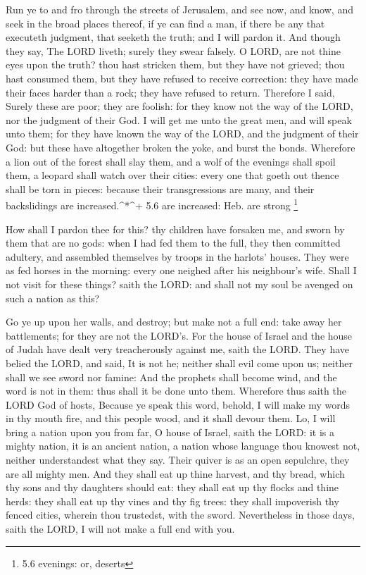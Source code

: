  Run ye to and fro through the streets of Jerusalem, and see
now, and know, and seek in the broad places thereof, if ye can find a
man, if there be any that executeth judgment, that seeketh the truth;
and I will pardon it.  And though they say, The LORD liveth;
surely they swear falsely.  O LORD, are not thine eyes upon
the truth? thou hast stricken them, but they have not grieved; thou hast
consumed them, but they have refused to receive correction: they have
made their faces harder than a rock; they have refused to return.
 Therefore I said, Surely these are poor; they are foolish:
for they know not the way of the LORD, nor the judgment of their God.
 I will get me unto the great men, and will speak unto them;
for they have known the way of the LORD, and the judgment of their God:
but these have altogether broken the yoke, and burst the bonds.
 Wherefore a lion out of the forest shall slay them, and a
wolf of the evenings shall spoil them, a leopard shall watch over their
cities: every one that goeth out thence shall be torn in pieces: because
their transgressions are many, and their backslidings are
increased.\^{}*\^{}+ 5.6 are increased: Heb. are strong \footnote{5.6
  evenings: or, deserts}

 How shall I pardon thee for this? thy children have
forsaken me, and sworn by them that are no gods: when I had fed them to
the full, they then committed adultery, and assembled themselves by
troops in the harlots' houses.  They were as fed horses in
the morning: every one neighed after his neighbour's wife. 
Shall I not visit for these things? saith the LORD: and shall not my
soul be avenged on such a nation as this?

 Go ye up upon her walls, and destroy; but make not a full
end: take away her battlements; for they are not the LORD's.
 For the house of Israel and the house of Judah have dealt
very treacherously against me, saith the LORD.  They have
belied the LORD, and said, It is not he; neither shall evil come upon
us; neither shall we see sword nor famine:  And the
prophets shall become wind, and the word is not in them: thus shall it
be done unto them.  Wherefore thus saith the LORD God of
hosts, Because ye speak this word, behold, I will make my words in thy
mouth fire, and this people wood, and it shall devour them.
 Lo, I will bring a nation upon you from far, O house of
Israel, saith the LORD: it is a mighty nation, it is an ancient nation,
a nation whose language thou knowest not, neither understandest what
they say.  Their quiver is as an open sepulchre, they are
all mighty men.  And they shall eat up thine harvest, and
thy bread, which thy sons and thy daughters should eat: they shall eat
up thy flocks and thine herds: they shall eat up thy vines and thy fig
trees: they shall impoverish thy fenced cities, wherein thou trustedst,
with the sword.  Nevertheless in those days, saith the
LORD, I will not make a full end with you.

